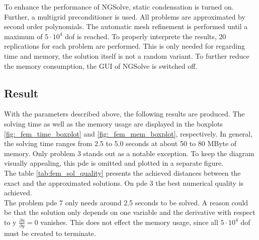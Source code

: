 \documentclass[./\jobname.tex]{subfiles}
\begin{document}
To enhance the performance of NGSolve, static condensation is turned on. Further, a multigrid preconditioner is used. All problems are approximated by second order polynomials. The automatic mesh refinement is performed until a maximum of $5 \cdot 10^4$ \gls{dof} is reached. To properly interprete the results, 20 replications for each problem are performed. This is only needed for regarding time and memory, the solution itself is not a random variant. To further reduce the memory consumption, the GUI of NGSolve is switched off. 

\subsection{Result}
With the parameters described above, the following results are produced. The solving time as well as the memory usage are displayed in the boxplots \ref{fig:_fem_time_boxplot} and \ref{fig:_fem_mem_boxplot}, respectively. In general, the solving time ranges from 2.5 to 5.0 seconds at about 50 to 80 MByte of memory. Only problem 3 stands out as a notable exception. To keep the diagram visually appealing, this \gls{pde} is omitted and plotted in a separate figure. \\

The table \ref{tab:fem_sol_quality} presents the achieved distances between the exact and the approximated solutions. On \gls{pde} 3 the best numerical quality is achieved.\\

The problem \gls{pde} 7 only needs around 2.5 seconds to be solved. A reason could be that the solution only depends on one variable and the derivative with respect to y $\frac{\partial u}{\partial y} = 0$ vanishes. This does not effect the memory usage, since all $5 \cdot 10^4$ \gls{dof} must be created to terminate. 
\end{document}
